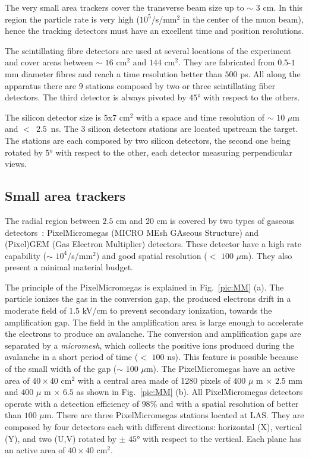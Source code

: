 The very small area trackers cover the transverse beam size up to $\sim$ $3$ cm. In this region the particle rate is very high ($10^5$/s/mm$^2$ in the center of the muon beam), hence the tracking detectors must have an excellent time and position resolutions.

The scintillating fibre detectors are used at several locations of the experiment and cover areas between $\sim$ $16$ cm$^2$ and $144$ cm$^2$. They are fabricated from $0.5$-$1$ mm diameter fibres and reach a time resolution better than $500$ ps. All along the apparatus there are $9$ stations composed by two or three scintillating fiber detectors. The third detector is always pivoted by $45$° with respect to the others.

The silicon detector size is $5$x$7$ cm$^2$ with a space and time resolution of $\sim$ $10$ $\mu$m and $<$~$2.5$~ns. The $3$ silicon detectors stations are located upstream the target. The stations are each composed by two silicon detectors, the second one being rotated by $5$° with respect to the other, each detector measuring perpendicular views.

\subsection{Small area trackers}

The radial region between $2.5$ cm and $20$ cm is covered by two types of gaseous detectors~: PixelMicromegas (MICRO MEsh GAseous Structure) and (Pixel)GEM (Gas Electron Multiplier) detectors. These detector have a high rate capability ($\sim$ $10^4$/s/mm$^2$) and good spatial resolution ($<$ $100$ $\mu$m). They also present a minimal material budget.

The principle of the PixelMicromegas is explained in Fig.~\ref{pic:MM} (a). The particle ionizes the gas in the conversion gap, the produced electrons drift in a moderate field of $1.5$ kV/cm to prevent secondary ionization, towards the amplification gap. The field in the amplification area is large enough to accelerate the electrons to produce an avalanche. The conversion and amplification gaps are separated by a \textit{micromesh}, which collects the positive ions produced during the avalanche in a short period of time ($<$ $100$ ns). This feature is possible because of the small width of the gap ($\sim$ $100$ $\mu$m). The PixelMicromegas have an active area of $40 \times 40$ cm$^2$ with a central area made of 1280 pixels of $400$ $\mu$ m $\times$ $2.5$ mm and $400$ $\mu$ m $\times$ $6.5$ \cite{FloThi} as shown in Fig.~\ref{pic:MM} (b). All PixelMicromegas detectors operate with a detection efficiency of $98$\% and with a spatial resolution of better than $100$ $\mu$m. There are three PixelMicromegas stations located at LAS. They are composed by four detectors each with different directions: horizontal (X), vertical (Y), and two (U,V) rotated by $\pm$ $45$° with respect to the vertical. Each plane has an active area of $40 \times 40$ cm$^2$.

